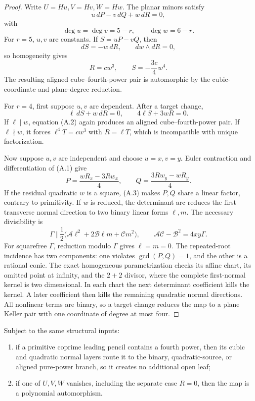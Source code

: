 \begin{proof}
Write \(U=Hu,V=Hv,W=Hw\).  The planar minors satisfy
\[
 u\,dP-v\,dQ+w\,dR=0,                       \tag{A.1}
\]
with
\[
 \deg u=\deg v=5-r,\qquad \deg w=6-r.
\]
For \(r=5\), \(u,v\) are constants.  If \(S=uP-vQ\), then
\[
 dS=-w\,dR,\qquad dw\wedge dR=0,
\]
so homogeneity gives
\[
 R=cw^3,\qquad S=-\frac{3c}{4}w^4.
\]
The resulting aligned cube--fourth-power pair is automorphic by the
cubic-coordinate and plane-degree reduction.

For \(r=4\), first suppose \(u,v\) are dependent.  After a target change,
\[
 \ell\,dS+w\,dR=0,\qquad 4\ell S+3wR=0.     \tag{A.2}
\]
If \(\ell\mid w\), equation (A.2) again produces an aligned
cube--fourth-power pair.  If \(\ell\nmid w\), it forces
\(\ell^4T=cw^3\) with \(R=\ell T\), which is incompatible with unique
factorization.

Now suppose \(u,v\) are independent and choose \(u=x,v=y\).  Euler
contraction and differentiation of (A.1) give
\[
 P=\frac{wR_x-3Rw_x}{4},\qquad
 Q=\frac{3Rw_y-wR_y}{4}.                    \tag{A.3}
\]
If the residual quadratic \(w\) is a square, (A.3) makes \(P,Q\) share a
linear factor, contrary to primitivity.  If \(w\) is reduced, the
determinant arc reduces the first transverse normal direction to two
binary linear forms \(\ell,m\).  The necessary divisibility is
\[
 \Gamma\mid
 \frac12\bigl(\mathcal A\ell^2+
 2\mathcal B\ell m+\mathcal C m^2\bigr),
 \qquad
 \mathcal A\mathcal C-\mathcal B^2=4xy\Gamma.       \tag{A.4}
\]
For squarefree \(\Gamma\), reduction modulo \(\Gamma\) gives
\(\ell=m=0\).  The repeated-root incidence has two components: one violates
\(\gcd(P,Q)=1\), and the other is a rational conic.  The exact homogeneous
parametrization checks its affine chart, its omitted point at infinity, and
the \(2+2\) divisor, where the complete first-normal kernel is two
dimensional.  In each chart the next determinant coefficient kills the
kernel.  A later coefficient then kills the remaining quadratic normal
directions.  All nonlinear terms are binary, so a target change reduces the
map to a plane Keller pair with one coordinate of degree at most four.
\end{proof}

\begin{proposition}
\label{prop:quartic-fourth-power-zero-minor}
Subject to the same structural inputs:
\begin{enumerate}[label=(\roman*)]
\item if a primitive coprime leading pencil contains a fourth power, then
its cubic and quadratic normal layers route it to the binary,
quadratic-source, or aligned pure-power branch, so it creates no additional
open leaf;
\item if one of \(U,V,W\) vanishes, including the separate case \(R=0\),
then the map is a polynomial automorphism.
\end{enumerate}
\end{proposition}

